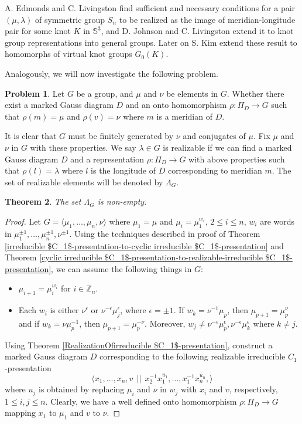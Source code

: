\documentclass[11 pt, reqno]{amsart}
\newtheorem{theorem}{Theorem}[section]
\theoremstyle{definition}
\newtheorem{problem}[theorem]{Problem}
\numberwithin{equation}{subsection}
\begin{document}
A. Edmonds and C. Livingston \cite{EL-1} find sufficient and necessary conditions for a pair $(\mu, \lambda)$ of symmetric group $S_n$ to be realized as the image of meridian-longitude pair for some knot $K$ in $\mathbb{S}^3$, and D. Johnson and C. Livingston \cite{JL-1} extend it to knot group representations into general groups. Later on S. Kim \cite{Kim-1} extend these result to homomorphs of virtual knot groups $G_0(K)$.
\par

Analogously, we will now investigate the following problem.

\begin{problem}
Let $G$ be a group, and $\mu$ and $\nu$ be elements in $G$. Whether there exist a marked Gauss diagram $D$ and an onto homomorphism $\rho: \Pi_D \to G$ such that $\rho(m)=\mu$ and $\rho(v)=\nu$ where $m$ is a meridian of $D$.
\end{problem}

It is clear that $G$ must be finitely generated by $\nu$ and conjugates of $\mu$. Fix $\mu$ and $\nu$ in $G$ with these properties. We say $\lambda \in G$ is realizable if we can find a marked Gauss diagram $D$ and a representation $\rho: \Pi_D \to G$ with above properties such that $\rho(l)=\lambda$ where $l$ is the longitude of $D$ corresponding to meridian $m$. The set of realizable elements will be denoted by $\Lambda_G$.

\begin{theorem}\label{NonEmptyRealizableSet}
The set $\Lambda_G$ is non-empty.
\end{theorem}
\begin{proof}
Let $G=\langle \mu_1, \ldots, \mu_n, \nu \rangle$ where $\mu_1=\mu$ and $\mu_i=\mu_1^{w_i}$, $2\leq i \leq n$, $w_i$ are words in $\mu_1^{\pm 1}, \ldots, \mu_n^{\pm 1}, \nu^{\pm 1}$. Using the techniques described in proof of Theorem \ref{irreducible $C_1$-presentation-to-cyclic irreducible $C_1$-presentation} and Theorem
\ref{cyclic irreducible $C_1$-presentation-to-realizable-irreducible $C_1$-presentation}, we can assume the following things in $G$:
\begin{itemize}
\item $\mu_{i+1}=\mu_i^{w_i}$ for $ i \in \mathbb{Z}_n$.
\item Each $w_i$ is either $\nu^{\epsilon}$ or $\nu^{-\epsilon} \mu_j^{\epsilon}$, where $\epsilon=\pm1$. If $w_k= \nu^{-1} \mu_p$, then $\mu_{p+1}=\mu_p^{\nu}$ and if $w_k= \nu \mu_p^{-1}$, then $\mu_{p+1}=\mu_p^{-\nu}$. Moreover, $w_j \neq \nu^{-\epsilon} \mu_p^{\epsilon}, \nu^{-\epsilon} \mu_k^{\epsilon}$ where $k \neq j$.
\end{itemize}
Using Theorem \ref{RealizationOfirreducible $C_1$-presentation}, construct a marked Gauss diagram $D$ corresponding to the following realizable irreducible $C_1$-presentation
$$
\langle x_1, \ldots, x_n, v~~||~~x_{2}^{-1}x_1^{u_1}, \ldots, x_1^{-1}x_n^{u_n}, \rangle
$$ where $u_j$ is obtained by replacing $\mu_i$ and $\nu$ in $w_j$ with $x_i$ and $v$, respectively, $1 \leq i,j \leq n$. Clearly, we have a well defined onto homomorphism $\rho: \Pi_D \to G$ mapping $x_1$ to $\mu_1$ and $v$ to $\nu$.
\end{proof}
\end{document}
